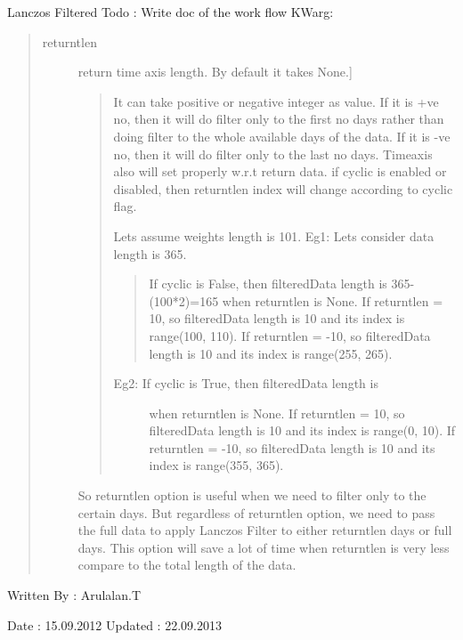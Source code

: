 \documentclass[letterpaper,10pt,english]{sphinxmanual}
\begin{document}

\begin{fulllineitems}
\label{mjo:variance_utils.lfilter}
Lanczos Filtered
Todo : Write doc of the work flow
KWarg:
\begin{quote}
\begin{description}
\item[{returntlen}] \leavevmode{[}return time axis length. By default it takes None.{]}\begin{quote}

It can take positive or negative integer as value.
If it is +ve no, then it will do filter only to
the first no days rather than doing filter to the
whole available days of the data.
If it is -ve no, then it will do filter only to
the last no days.
Timeaxis also will set properly w.r.t return data.
if cyclic is enabled or disabled, then returntlen
index will change according to cyclic flag.

Lets assume weights length is 101.
Eg1: Lets consider data length is 365.
\begin{quote}

If cyclic is False, then filteredData length is
365-(100*2)=165 when returntlen is None.
If returntlen = 10, so filteredData length is 10
and its index is range(100, 110).
If returntlen = -10, so filteredData length is 10
and its index is range(255, 265).
\end{quote}
\begin{description}
\item[{Eg2: If cyclic is True, then filteredData length is}]  when returntlen is None.
If returntlen = 10, so filteredData length is 10
and its index is range(0, 10).
If returntlen = -10, so filteredData length is 10
and its index is range(355, 365).

\end{description}
\end{quote}

So returntlen option is useful when we need to filter
only to the certain days. But regardless of returntlen
option, we need to pass the full data to apply Lanczos
Filter to either returntlen days or full days.
This option will save a lot of time when returntlen is
very less compare to the total length of the data.

\end{description}
\end{quote}

Written By : Arulalan.T

Date : 15.09.2012
Updated : 22.09.2013

\end{fulllineitems}
\end{document}
